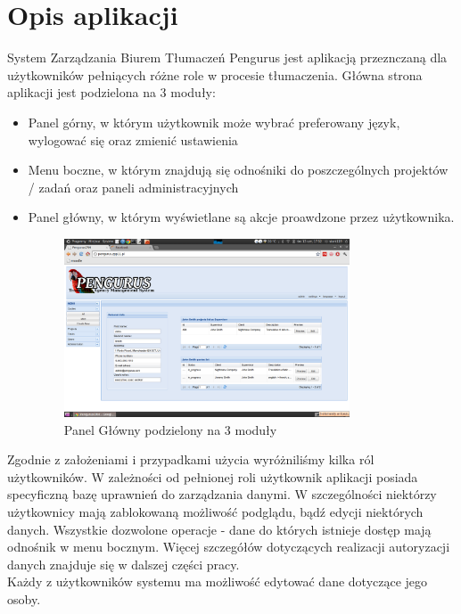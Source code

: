 \documentclass[licencjacka]{pracamgr}
\begin{document}
\section{Opis aplikacji}
System Zarządzania Biurem Tłumaczeń Pengurus jest aplikacją przeznczaną dla użytkowników pełniących różne role w procesie tłumaczenia.
Główna strona aplikacji jest podzielona na 3 moduły:
\begin{itemize}
\item Panel górny, w którym użytkownik może wybrać preferowany język, wylogować się oraz zmienić ustawienia
\item  Menu boczne, w którym znajdują się odnośniki do poszczególnych projektów / zadań oraz paneli administracyjnych
\item  Panel główny, w którym wyświetlane są akcje proawdzone przez użytkownika.  
\begin{figure}[ht!]
\centering
\includegraphics[width=0.8\textwidth]{resources/panel_glowny.png}
\caption{Panel Główny podzielony na 3 moduły}
\end{figure}
\end{itemize}

Zgodnie z założeniami i przypadkami użycia wyróżniliśmy kilka ról użytkowników. W zależności od pełnionej roli użytkownik aplikacji posiada specyficzną bazę uprawnień do zarządzania danymi. W szczególności niektórzy użytkownicy mają zablokowaną możliwość podglądu, bądź edycji niektórych danych. Wszystkie dozwolone operacje - dane do których istnieje dostęp mają odnośnik w menu bocznym.
Więcej szczegółów dotyczących realizacji autoryzacji danych znajduje się w dalszej części pracy.\\

Każdy z użytkowników systemu ma możliwość edytować dane dotyczące jego osoby.\\ 
\end{document}
